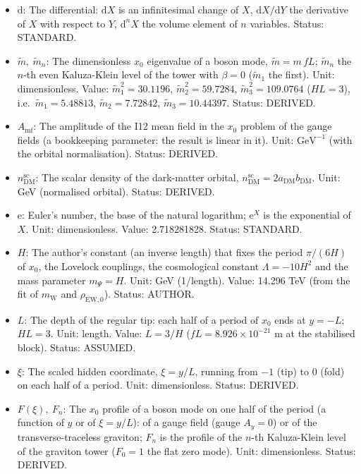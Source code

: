 \documentclass[
  10pt,
]{article}
\providecommand{\tightlist}{%
  \setlength{\itemsep}{0pt}\setlength{\parskip}{0pt}}
\begin{document}
\begin{itemize}
\tightlist
\item
  \(\mathrm{d}\): The differential: \(\mathrm{d}X\) is an infinitesimal
  change of \(X\), \(\mathrm{d}X/\mathrm{d}Y\) the derivative of \(X\)
  with respect to \(Y\), \(\mathrm{d}^nX\) the volume element of \(n\)
  variables. Status: STANDARD.
\item
  \(\tilde m,\ \tilde m_n\): The dimensionless \(x_0\) eigenvalue of a
  boson mode, \(\tilde m = m\,fL\); \(\tilde m_n\) the \(n\)-th even
  Kaluza-Klein level of the tower with \(\beta = 0\) (\(\tilde m_1\) the
  first). Unit: dimensionless. Value: \(\tilde m_1^2 = 30.1196\),
  \(\tilde m_2^2 = 59.7284\), \(\tilde m_3^2 = 109.0764\) (\(HL = 3\)),
  i.e.~\(\tilde m_1 = 5.48813\), \(\tilde m_2 = 7.72842\),
  \(\tilde m_3 = 10.44397\). Status: DERIVED.
\item
  \(A_{\mathrm{mf}}\): The amplitude of the I12 mean field in the
  \(x_0\) problem of the gauge fields (a bookkeeping parameter: the
  result is linear in it). Unit: \(\mathrm{GeV}^{-1}\) (with the orbital
  normalisation). Status: DERIVED.
\item
  \(n^{\mathrm{sc}}_{\mathrm{DM}}\): The scalar density of the
  dark-matter orbital,
  \(n^{\mathrm{sc}}_{\mathrm{DM}} = 2a_{\mathrm{DM}}b_{\mathrm{DM}}\).
  Unit: GeV (normalised orbital). Status: DERIVED.
\item
  \(\mathrm{e}\): Euler's number, the base of the natural logarithm;
  \(\mathrm{e}^{X}\) is the exponential of \(X\). Unit: dimensionless.
  Value: 2.718281828. Status: STANDARD.
\item
  \(H\): The author's constant (an inverse length) that fixes the period
  \(\pi/(6H)\) of \(x_0\), the Lovelock couplings, the cosmological
  constant \(\Lambda = -10H^2\) and the mass parameter \(m_\Psi = H\).
  Unit: GeV (1/length). Value: 14.296 TeV (from the fit of
  \(m_{\mathrm{W}}\) and \(\rho_{\mathrm{EW},0}\)). Status: AUTHOR.
\item
  \(L\): The depth of the regular tip: each half of a period of \(x_0\)
  ends at \(y = -L\); \(HL = 3\). Unit: length. Value: \(L = 3/H\)
  (\(fL = 8.926\times10^{-21}\) m at the stabilised block). Status:
  ASSUMED.
\item
  \(\xi\): The scaled hidden coordinate, \(\xi = y/L\), running from
  \(-1\) (tip) to \(0\) (fold) on each half of a period. Unit:
  dimensionless. Status: DERIVED.
\item
  \(F(\xi),\ F_n\): The \(x_0\) profile of a boson mode on one half of
  the period (a function of \(y\) or of \(\xi = y/L\)): of a gauge field
  (gauge \(A_y = 0\)) or of the transverse-traceless graviton; \(F_n\)
  is the profile of the \(n\)-th Kaluza-Klein level of the graviton
  tower (\(F_0 = 1\) the flat zero mode). Unit: dimensionless. Status:
  DERIVED.
\end{itemize}
\end{document}
